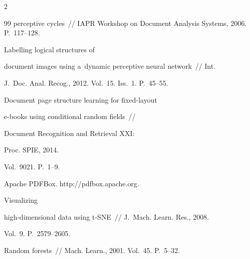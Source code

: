 \begin{multicols}{2}
{{\begin{thebibliography}{99}
perceptive cycles~// IAPR Workshop on Document Analysis Systems, 2006. P.~117--128.







 Labelling logical structures of 


document images using a~dynamic perceptive neural network~// Int. 


J.~Doc. Anal. Recog., 2012. Vol.~15. Iss.~1. P.~45--55.







 Document page structure learning for fixed-layout 


e-books using conditional random fields~// 


 Document Recognition and Retrieval XXI:


 Proc. SPIE, 2014. 


Vol.~9021. P.~1--9.







Apache PDFBox. {\sf http://pdfbox.apache.org}.







 Visualizing 


high-dimensional data using t-SNE~// J.~Mach. Learn. Res., 2008. 


Vol.~9. P.~2579--2605.







 Random forests~// Mach. Learn., 2001. Vol.~45. P.~5--32.





 \end{thebibliography}





 }


 }





\end{multicols}





